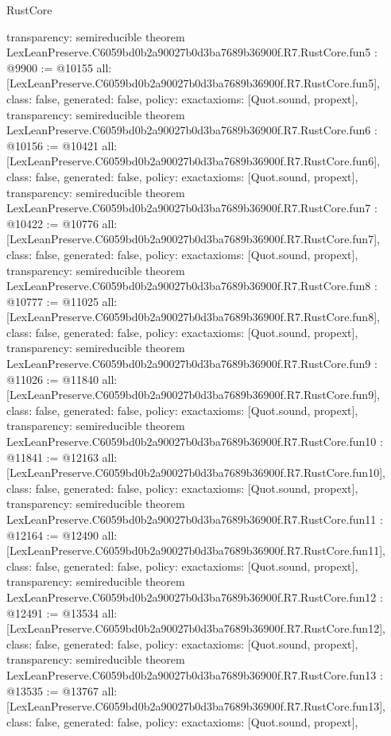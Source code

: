 \begin{lexlean}{RustCore}
\begin{coremodule}
{  transparency: semireducible
}
theorem LexLeanPreserve.C6059bd0b2a90027b0d3ba7689b36900f.R7.RustCore.fun5 : @9900 := @10155 {
  all: [LexLeanPreserve.C6059bd0b2a90027b0d3ba7689b36900f.R7.RustCore.fun5],
  class: false,
  generated: false,
  policy: exact{axioms: [Quot.sound, propext]},
  transparency: semireducible
}
theorem LexLeanPreserve.C6059bd0b2a90027b0d3ba7689b36900f.R7.RustCore.fun6 : @10156 := @10421 {
  all: [LexLeanPreserve.C6059bd0b2a90027b0d3ba7689b36900f.R7.RustCore.fun6],
  class: false,
  generated: false,
  policy: exact{axioms: [Quot.sound, propext]},
  transparency: semireducible
}
theorem LexLeanPreserve.C6059bd0b2a90027b0d3ba7689b36900f.R7.RustCore.fun7 : @10422 := @10776 {
  all: [LexLeanPreserve.C6059bd0b2a90027b0d3ba7689b36900f.R7.RustCore.fun7],
  class: false,
  generated: false,
  policy: exact{axioms: [Quot.sound, propext]},
  transparency: semireducible
}
theorem LexLeanPreserve.C6059bd0b2a90027b0d3ba7689b36900f.R7.RustCore.fun8 : @10777 := @11025 {
  all: [LexLeanPreserve.C6059bd0b2a90027b0d3ba7689b36900f.R7.RustCore.fun8],
  class: false,
  generated: false,
  policy: exact{axioms: [Quot.sound, propext]},
  transparency: semireducible
}
theorem LexLeanPreserve.C6059bd0b2a90027b0d3ba7689b36900f.R7.RustCore.fun9 : @11026 := @11840 {
  all: [LexLeanPreserve.C6059bd0b2a90027b0d3ba7689b36900f.R7.RustCore.fun9],
  class: false,
  generated: false,
  policy: exact{axioms: [Quot.sound, propext]},
  transparency: semireducible
}
theorem LexLeanPreserve.C6059bd0b2a90027b0d3ba7689b36900f.R7.RustCore.fun10 : @11841 := @12163 {
  all: [LexLeanPreserve.C6059bd0b2a90027b0d3ba7689b36900f.R7.RustCore.fun10],
  class: false,
  generated: false,
  policy: exact{axioms: [Quot.sound, propext]},
  transparency: semireducible
}
theorem LexLeanPreserve.C6059bd0b2a90027b0d3ba7689b36900f.R7.RustCore.fun11 : @12164 := @12490 {
  all: [LexLeanPreserve.C6059bd0b2a90027b0d3ba7689b36900f.R7.RustCore.fun11],
  class: false,
  generated: false,
  policy: exact{axioms: [Quot.sound, propext]},
  transparency: semireducible
}
theorem LexLeanPreserve.C6059bd0b2a90027b0d3ba7689b36900f.R7.RustCore.fun12 : @12491 := @13534 {
  all: [LexLeanPreserve.C6059bd0b2a90027b0d3ba7689b36900f.R7.RustCore.fun12],
  class: false,
  generated: false,
  policy: exact{axioms: [Quot.sound, propext]},
  transparency: semireducible
}
theorem LexLeanPreserve.C6059bd0b2a90027b0d3ba7689b36900f.R7.RustCore.fun13 : @13535 := @13767 {
  all: [LexLeanPreserve.C6059bd0b2a90027b0d3ba7689b36900f.R7.RustCore.fun13],
  class: false,
  generated: false,
  policy: exact{axioms: [Quot.sound, propext]},
}
\end{coremodule}
\end{lexlean}
